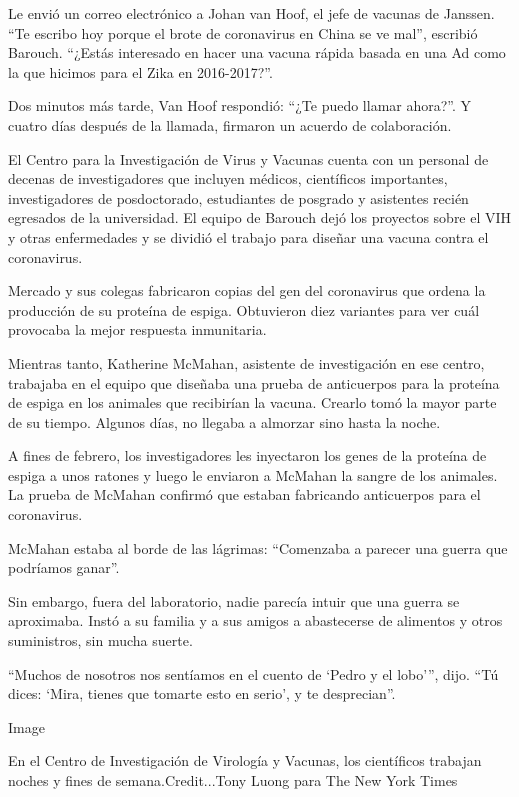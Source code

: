 Le envió un correo electrónico a Johan van Hoof, el jefe de vacunas de
Janssen. ``Te escribo hoy porque el brote de coronavirus en China se ve
mal'', escribió Barouch. ``¿Estás interesado en hacer una vacuna rápida
basada en una Ad como la que hicimos para el Zika en 2016-2017?''.

Dos minutos más tarde, Van Hoof respondió: ``¿Te puedo llamar ahora?''.
Y cuatro días después de la llamada, firmaron un acuerdo de
colaboración.

El Centro para la Investigación de Virus y Vacunas cuenta con un
personal de decenas de investigadores que incluyen médicos, científicos
importantes, investigadores de posdoctorado, estudiantes de posgrado y
asistentes recién egresados de la universidad. El equipo de Barouch dejó
los proyectos sobre el VIH y otras enfermedades y se dividió el trabajo
para diseñar una vacuna contra el coronavirus.

Mercado y sus colegas fabricaron copias del gen del coronavirus que
ordena la producción de su proteína de espiga. Obtuvieron diez variantes
para ver cuál provocaba la mejor respuesta inmunitaria.

Mientras tanto, Katherine McMahan, asistente de investigación en ese
centro, trabajaba en el equipo que diseñaba una prueba de anticuerpos
para la proteína de espiga en los animales que recibirían la vacuna.
Crearlo tomó la mayor parte de su tiempo. Algunos días, no llegaba a
almorzar sino hasta la noche.

A fines de febrero, los investigadores les inyectaron los genes de la
proteína de espiga a unos ratones y luego le enviaron a McMahan la
sangre de los animales. La prueba de McMahan confirmó que estaban
fabricando anticuerpos para el coronavirus.

McMahan estaba al borde de las lágrimas: ``Comenzaba a parecer una
guerra que podríamos ganar''.

Sin embargo, fuera del laboratorio, nadie parecía intuir que una guerra
se aproximaba. Instó a su familia y a sus amigos a abastecerse de
alimentos y otros suministros, sin mucha suerte.

``Muchos de nosotros nos sentíamos en el cuento de `Pedro y el lobo''',
dijo. ``Tú dices: `Mira, tienes que tomarte esto en serio', y te
desprecian''.

Image

En el Centro de Investigación de Virología y Vacunas, los científicos
trabajan noches y fines de semana.Credit...Tony Luong para The New York
Times

